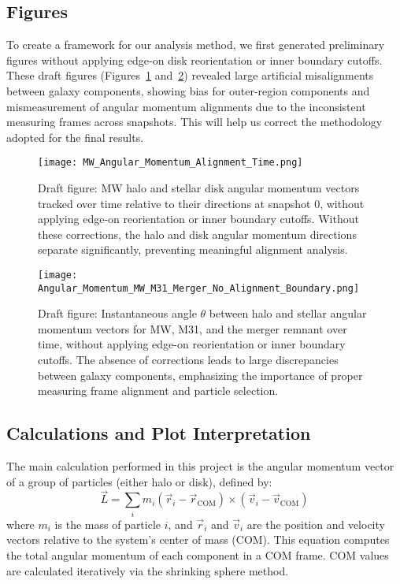 \documentclass[twocolumn]{aastex631}
\begin{document}
\subsection{Figures}
To create a framework for our analysis method, we first generated preliminary figures without applying edge-on disk reorientation or inner boundary cutoffs. These draft figures (Figures~\ref{fig:draft_mw_alignment} and~\ref{fig:draft_halo_disk_angle}) revealed large artificial misalignments between galaxy components, showing bias for outer-region components and mismeasurement of angular momentum alignments due to the  inconsistent measuring frames across snapshots. This will help us correct the methodology adopted for the final results.


\begin{figure}[H]
    \centering
    \texttt{[image: MW\_Angular\_Momentum\_Alignment\_Time.png]}
    \caption{Draft figure: MW halo and stellar disk angular momentum vectors tracked over time relative to their directions at snapshot 0, without applying edge-on reorientation or inner boundary cutoffs. Without these corrections, the halo and disk angular momentum directions separate significantly, preventing meaningful alignment analysis.}
    \label{fig:draft_mw_alignment}
\end{figure}

\begin{figure}[H]
    \centering
    \texttt{[image: Angular\_Momentum\_MW\_M31\_Merger\_No\_Alignment\_Boundary.png]}
    \caption{Draft figure: Instantaneous angle $\theta$ between halo and stellar angular momentum vectors for MW, M31, and the merger remnant over time, without applying edge-on reorientation or inner boundary cutoffs. The absence of corrections leads to large discrepancies between galaxy components, emphasizing the importance of proper measuring frame alignment and particle selection.}
    \label{fig:draft_halo_disk_angle}
\end{figure}

\subsection{Calculations and Plot Interpretation}

The main calculation performed in this project is the angular momentum vector of a group of particles (either halo or disk), defined by:
\[
\vec{L} = \sum_i m_i (\vec{r}_i - \vec{r}_{\text{COM}}) \times (\vec{v}_i - \vec{v}_{\text{COM}})
\]
where $m_i$ is the mass of particle $i$, and $\vec{r}_i$ and $\vec{v}_i$ are the position and velocity vectors relative to the system’s center of mass (COM). This equation computes the total angular momentum of each component in a COM frame. COM values are calculated iteratively via the shrinking sphere method.
\end{document}
